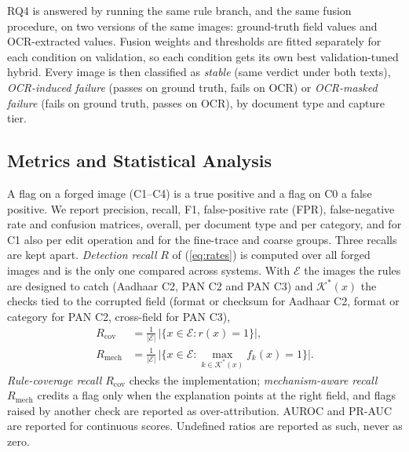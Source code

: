\documentclass[conference]{IEEEtran}
\begin{document}
RQ4 is answered by running the same rule branch, and the same fusion
procedure, on two versions of the same images: ground-truth field
values and OCR-extracted values. Fusion weights and thresholds are
fitted separately for each condition on validation, so each condition
gets its own best validation-tuned hybrid. Every image is then
classified as \emph{stable} (same verdict under both texts),
\emph{OCR-induced failure} (passes on ground truth, fails on OCR) or
\emph{OCR-masked failure} (fails on ground truth, passes on OCR), by
document type and capture tier.

\subsection{Metrics and Statistical Analysis}
\label{sec:metrics}

A flag on a forged image (C1--C4) is a true positive and a flag on C0 a
false positive. We report precision, recall, F1, false-positive rate
(FPR), false-negative rate and confusion matrices, overall, per document
type and per category, and for C1 also per edit operation and for the
fine-trace and coarse groups. Three recalls are kept apart.
\emph{Detection recall} $R$ of (\ref{eq:rates}) is computed over all
forged images and is the only one compared across systems. With
$\mathcal{E}$ the images the rules are designed to catch (Aadhaar C2,
PAN C2 and PAN C3) and $\mathcal{K}^{\ast}(x)$ the checks tied to the
corrupted field (format or checksum for Aadhaar C2, format or category
for PAN C2, cross-field for PAN C3),
\begin{equation}
\label{eq:recalls}
\begin{aligned}
R_{\mathrm{cov}}&=\frac{1}{|\mathcal{E}|}\,\big|\{x\in\mathcal{E}: r(x)=1\}\big|,\\
R_{\mathrm{mech}}&=\frac{1}{|\mathcal{E}|}\,\big|\{x\in\mathcal{E}: \textstyle\max_{k\in\mathcal{K}^{\ast}(x)} f_k(x)=1\}\big|.
\end{aligned}
\end{equation}
\emph{Rule-coverage recall} $R_{\mathrm{cov}}$ checks the implementation;
\emph{mechanism-aware recall} $R_{\mathrm{mech}}$ credits a flag only
when the explanation points at the right field, and flags raised by
another check are reported as over-attribution. AUROC and PR-AUC are
reported for continuous scores. Undefined ratios are reported as such,
never as zero.
\end{document}

